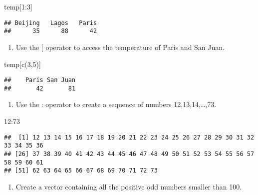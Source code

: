 \documentclass[
]{article}
\newenvironment{Shaded}{\begin{snugshade}}{\end{snugshade}}
\newcommand{\DecValTok}[1]{\textcolor[rgb]{0.00,0.00,0.81}{#1}}
\newcommand{\FunctionTok}[1]{\textcolor[rgb]{0.00,0.00,0.00}{#1}}
\newcommand{\NormalTok}[1]{#1}
\newcommand{\SpecialCharTok}[1]{\textcolor[rgb]{0.00,0.00,0.00}{#1}}
\providecommand{\tightlist}{%
  \setlength{\itemsep}{0pt}\setlength{\parskip}{0pt}}
\begin{document}
\begin{Shaded}
\begin{Highlighting}[]
\NormalTok{temp[}\DecValTok{1}\SpecialCharTok{:}\DecValTok{3}\NormalTok{]}
\end{Highlighting}
\end{Shaded}

\begin{verbatim}
## Beijing   Lagos   Paris 
##      35      88      42
\end{verbatim}

\begin{enumerate}
\def\labelenumi{\arabic{enumi}.}
\setcounter{enumi}{4}
\tightlist
\item
  Use the {[} operator to access the temperature of Paris and San Juan.
\end{enumerate}

\begin{Shaded}
\begin{Highlighting}[]
\NormalTok{temp[}\FunctionTok{c}\NormalTok{(}\DecValTok{3}\NormalTok{,}\DecValTok{5}\NormalTok{)]}
\end{Highlighting}
\end{Shaded}

\begin{verbatim}
##    Paris San Juan 
##       42       81
\end{verbatim}

\begin{enumerate}
\def\labelenumi{\arabic{enumi}.}
\setcounter{enumi}{5}
\tightlist
\item
  Use the : operator to create a sequence of numbers 12,13,14,\ldots,73.
\end{enumerate}

\begin{Shaded}
\begin{Highlighting}[]
\DecValTok{12}\SpecialCharTok{:}\DecValTok{73}
\end{Highlighting}
\end{Shaded}

\begin{verbatim}
##  [1] 12 13 14 15 16 17 18 19 20 21 22 23 24 25 26 27 28 29 30 31 32 33 34 35 36
## [26] 37 38 39 40 41 42 43 44 45 46 47 48 49 50 51 52 53 54 55 56 57 58 59 60 61
## [51] 62 63 64 65 66 67 68 69 70 71 72 73
\end{verbatim}

\begin{enumerate}
\def\labelenumi{\arabic{enumi}.}
\setcounter{enumi}{6}
\tightlist
\item
  Create a vector containing all the positive odd numbers smaller than
  100.
\end{enumerate}
\end{document}
